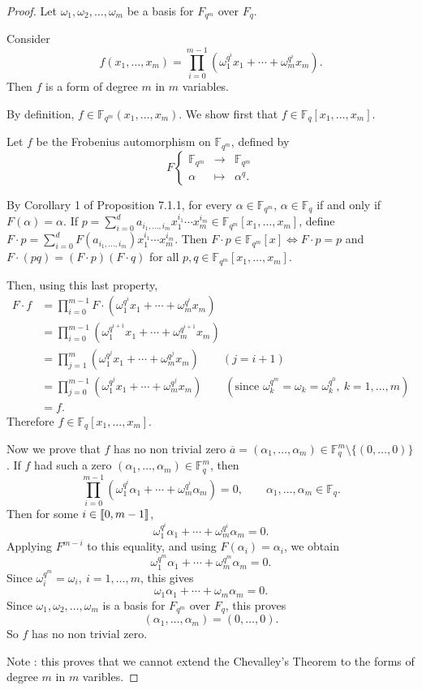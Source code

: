 \documentclass[11pt,a4paper]{article}
\def\gcro{\mbox{[\hspace{-.15em}[}}%
\def\dcro{\mbox{]\hspace{-.15em}]}}
\newcommand{\F}{\mathbb{F}}
\begin{document}
\begin{proof}
Let $\omega_1,\omega_2,\ldots,\omega_m$ be a basis for $F_{q^m}$ over $F_q$.

Consider $$f(x_1,\ldots,x_m) = \prod_{i=0}^{m-1} (\omega_1^{q^i} x_1 + \cdots + \omega_m^{q^i} x_m).$$
Then $f$ is a form of degree $m$ in $m$ variables.

By definition, $f \in \F_{q^m}(x_1,\ldots,x_m)$. We show first that $f \in \F_q[x_1,\ldots,x_m]$.

Let $f$ be the Frobenius automorphism on $\F_{q^m}$, defined by
$$F
\left\{
\begin{array}{ccl}
\F_{q^m} & \to &\F_{q^m}\\
\alpha & \mapsto & \alpha^q.
\end{array}
\right.
$$

By Corollary 1 of Proposition 7.1.1, for every $\alpha \in \F_{q^m}$, $\alpha \in \F_q$ if and only if $F(\alpha) = \alpha$. If $p = \sum_{i=0}^d a_{i_1,\ldots,i_m}  x_1^{i_1} \cdots x_m^{i_m} \in \F_{q^m}[x_1,\ldots,x_m]$, define $F\cdot p =\sum_{i=0}^d F(a_{i_1,\ldots,i_m})  x_1^{i_1} \cdots x_m^{i_m} $. Then $F \cdot p \in \F_{q^m}[x] \iff F \cdot p = p$ and $F\cdot (pq) = (F\cdot p)(F \cdot q)$ for all $p,q \in  \F_{q^m}[x_1,\ldots,x_m]$.

Then, using this last property, 
\begin{align*}
F \cdot f &= \prod_{i=0}^{m-1} F \cdot (\omega_1^{q^i} x_1 + \cdots + \omega_m^{q^i} x_m)\\
&=\prod_{i=0}^{m-1} (\omega_1^{q^{i+1}} x_1 + \cdots + \omega_m^{q^{i+1}} x_m)\\
&=\prod_{j=1}^{m} (\omega_1^{q^j} x_1 + \cdots + \omega_m^{q^j} x_m) \qquad (j=i+1)\\
&=\prod_{j=0}^{m-1} (\omega_1^{q^j} x_1 + \cdots + \omega_m^{q^j} x_m) \qquad (\text{since } \omega_k^{q^m} = \omega_k = \omega_k^{q^0},\ k=1,\ldots,m)\\
&= f.
\end{align*}
Therefore $f \in \F_q[x_1,\ldots,x_m]$.

Now we prove that $f$ has no non trivial zero $\overline{a} = (\alpha_1,\ldots,\alpha_m) \in \F_q^m \setminus \{(0,\ldots,0)\}$. If $f$ had such a zero $(\alpha_1,\ldots,\alpha_m) \in \F_q^m$, then 
$$\prod_{i=0}^{m-1} (\omega_1^{q^i} \alpha_1 + \cdots + \omega_m^{q^i} \alpha_m) = 0,\qquad \alpha_1,\ldots,\alpha_m \in \F_q.$$
Then for some $i \in \gcro 0,m-1 \dcro$,
$$\omega_1^{q^i} \alpha_1 + \cdots + \omega_m^{q^i} \alpha_m = 0.$$
Applying $F^{m-i}$ to this equality, and using $F(\alpha_i) = \alpha_i$, we obtain
$$\omega_1^{q^m} \alpha_1 + \cdots + \omega_m^{q^m} \alpha_m = 0.$$
Since $\omega_i^{q^m} = \omega_i,\ i = 1,\ldots,m$, this gives
$$\omega_1 \alpha_1 + \cdots + \omega_m \alpha_m = 0.$$
Since $\omega_1,\omega_2,\ldots,\omega_m$ is a basis for $F_{q^m}$ over $F_q$, this proves
$$(\alpha_1,\ldots,\alpha_m) = (0,\ldots,0).$$
So $f$ has no non trivial zero.

Note : this proves that we cannot extend the Chevalley's Theorem to the forms of degree $m$ in $m$ varibles.
\end{proof}
\end{document}

